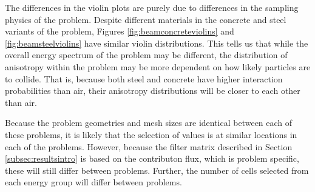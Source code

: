 The differences in the violin plots are purely due to differences in the
sampling physics of the problem. Despite different materials in the concrete and
steel variants of the problem, Figures
\ref{fig:beamconcreteviolins} and \ref{fig:beamsteelviolins} have similar violin
distributions. This tells us that while the overall energy spectrum of the
problem may be different, the distribution of anisotropy within the problem may
be more dependent on how likely particles are to collide. That is, because both
steel and concrete have higher interaction probabilities than air, their
anisotropy distributions will be closer to each other than air.

Because the problem geometries and mesh sizes are identical between each of
these problems, it is likely that the selection of values is at similar
locations in each of the problems. 
However, because the filter matrix described
in Section \ref{subsec:resultsintro} is based on the contributon flux, which is
problem specific, these will still differ between problems. Further, the number
of cells selected from each energy group will differ between problems.


